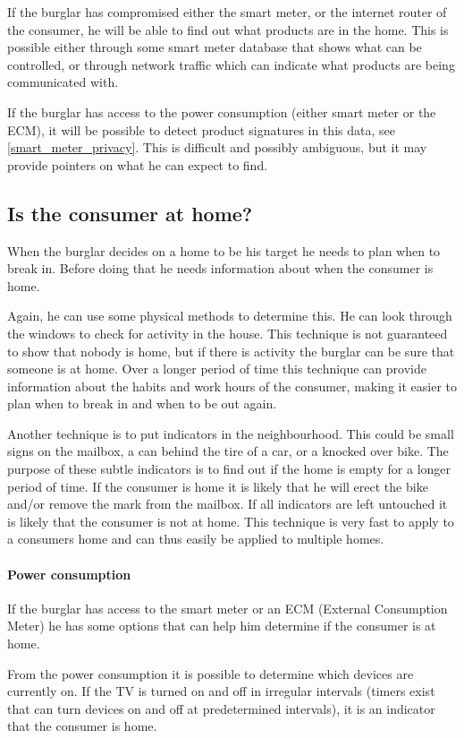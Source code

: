If the burglar has compromised either the smart meter, or the internet router of the consumer, he will be able to find out what products are in the home. 
This is possible either through some smart meter database that shows what can be controlled, or through network traffic which can indicate what products are being communicated with.

If the burglar has access to the power consumption (either smart meter or the ECM), it will be possible to detect product signatures in this data, see \cref{smart_meter_privacy}.
This is difficult and possibly ambiguous, but it may provide pointers on what he can expect to find.

\subsection{Is the consumer at home?}
When the burglar decides on a home to be his target he needs to plan when to break in.
Before doing that he needs information about when the consumer is home.

Again, he can use some physical methods to determine this.
He can look through the windows to check for activity in the house.
This technique is not guaranteed to show that nobody is home, but if there is activity the burglar can be sure that someone is at home.
Over a longer period of time this technique can provide information about the habits and work hours of the consumer, making it easier to plan when to break in and when to be out again.

Another technique is to put indicators in the neighbourhood.
This could be small signs on the mailbox, a can behind the tire of a car, or a knocked over bike.
The purpose of these subtle indicators is to find out if the home is empty for a longer period of time.
If the consumer is home it is likely that he will erect the bike and/or remove the mark from the mailbox.
If all indicators are left untouched it is likely that the consumer is not at home.
This technique is very fast to apply to a consumers home and can thus easily be applied to multiple homes.

\paragraph{Power consumption}
If the burglar has access to the smart meter or an ECM (External Consumption Meter) he has some options that can help him determine if the consumer is at home.

From the power consumption it is possible to determine which devices are currently on. 
If the TV is turned on and off in irregular intervals (timers exist that can turn devices on and off at predetermined intervals), it is an indicator that the consumer is home.

